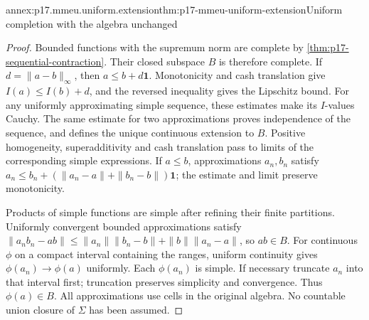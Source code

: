 \begin{annexitem}{annex:p17.mmeu.uniform.extension}{thm:p17-mmeu-uniform-extension}{Uniform completion with the algebra unchanged}
\begin{proof}
Bounded functions with the supremum norm
are complete by \cref{thm:p17-sequential-contraction}.
Their closed subspace \(B\) is therefore complete.
If \(d=\|a-b\|_\infty\), then \(a\leq b+d\mathbf1\).
Monotonicity and cash translation give
\(I(a)\leq I(b)+d\), and the reversed inequality
gives the Lipschitz bound.
For any uniformly approximating simple sequence,
these estimates make its \(I\)-values Cauchy.
The same estimate for two approximations proves
independence of the sequence, and defines the
unique continuous extension to \(B\).
Positive homogeneity, superadditivity and
cash translation pass to limits of the
corresponding simple expressions.
If \(a\leq b\), approximations \(a_n,b_n\)
satisfy
\(a_n\leq b_n+(\|a_n-a\|+\|b_n-b\|)\mathbf1\);
the estimate and limit preserve monotonicity.

Products of simple functions are simple after
refining their finite partitions.
Uniformly convergent bounded approximations
satisfy
\(\|a_nb_n-ab\|\leq\|a_n\|\|b_n-b\|+\|b\|\|a_n-a\|\),
so \(ab\in B\).
For continuous \(\phi\) on a compact interval
containing the ranges, uniform continuity gives
\(\phi(a_n)\to\phi(a)\) uniformly.
Each \(\phi(a_n)\) is simple. If necessary
truncate \(a_n\) into that interval first;
truncation preserves simplicity and convergence.
Thus \(\phi(a)\in B\).
All approximations use cells in the original
algebra. No countable union closure of
\(\Sigma\) has been assumed.
\end{proof}
\end{annexitem}

